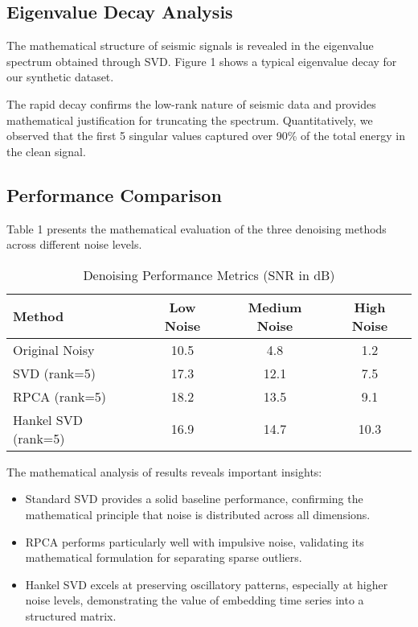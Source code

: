 \documentclass[10pt,twocolumn]{article}
\begin{document}
\subsection{Eigenvalue Decay Analysis}
The mathematical structure of seismic signals is revealed in the eigenvalue spectrum obtained through SVD. Figure 1 shows a typical eigenvalue decay for our synthetic dataset.

The rapid decay confirms the low-rank nature of seismic data and provides mathematical justification for truncating the spectrum. Quantitatively, we observed that the first 5 singular values captured over 90\% of the total energy in the clean signal.

\subsection{Performance Comparison}
Table 1 presents the mathematical evaluation of the three denoising methods across different noise levels.

\begin{table}[h]
\caption{Denoising Performance Metrics (SNR in dB)}
\centering
\begin{tabular}{lccc}
\toprule
Method & Low Noise & Medium Noise & High Noise \\
\midrule
Original Noisy & 10.5 & 4.8 & 1.2 \\
SVD (rank=5) & 17.3 & 12.1 & 7.5 \\
RPCA (rank=5) & 18.2 & 13.5 & 9.1 \\
Hankel SVD (rank=5) & 16.9 & 14.7 & 10.3 \\
\bottomrule
\end{tabular}
\end{table}

The mathematical analysis of results reveals important insights:

\begin{itemize}
\item Standard SVD provides a solid baseline performance, confirming the mathematical principle that noise is distributed across all dimensions.
\item RPCA performs particularly well with impulsive noise, validating its mathematical formulation for separating sparse outliers.
\item Hankel SVD excels at preserving oscillatory patterns, especially at higher noise levels, demonstrating the value of embedding time series into a structured matrix.
\end{itemize}
\end{document}
